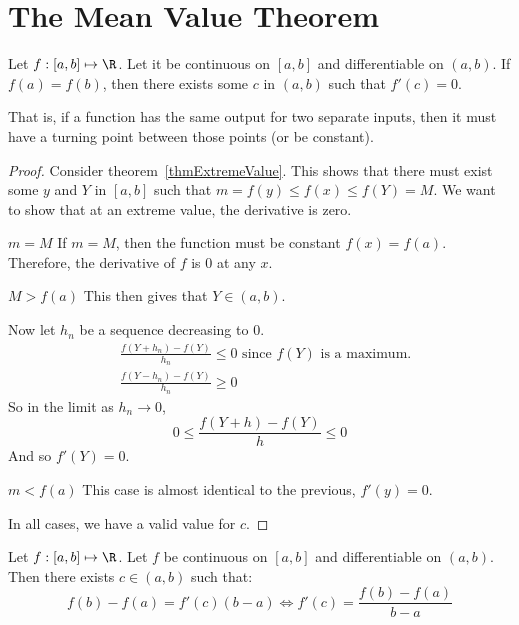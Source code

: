 \documentclass[../Main.tex]{subfiles}
\begin{document}
\section{The Mean Value Theorem}
\begin{theorem}
    Let $f : [a, b] \mapsto \R$. Let it be continuous on $[a, b]$ and differentiable on $(a, b)$. If $f(a) = f(b)$, then there exists some $c$ in $(a, b)$ such that $f'(c) = 0$.
    \label{thmRolles}
\end{theorem}
That is, if a function has the same output for two separate inputs, then it must have a turning point between those points (or be constant).
\begin{proof}
    Consider theorem~\ref{thmExtremeValue}. This shows that there must exist some $y$ and $Y$ in $[a, b]$ such that $m = f(y) \leq f(x) \leq f(Y) = M$. We want to show that at an extreme value, the derivative is zero.
    \begin{case}{$m = M$}
        If $m = M$, then the function must be constant $f(x) = f(a)$. Therefore, the derivative of $f$ is 0 at any $x$.
    \end{case}
    \begin{case}{$M > f(a)$}
        This then gives that $Y \in (a, b)$.\par
        Now let $h_n$ be a sequence decreasing to $0$.
        \begin{align*}
            &\frac{f(Y + h_n) - f(Y)}{h_n} \leq 0 \text{ since } f(Y) \text{ is a maximum.} \\
            &\frac{f(Y - h_n) - f(Y)}{h_n} \geq 0
        \end{align*}
        So in the limit as $h_n \to 0$,
        \begin{equation*}
            0 \leq \frac{f(Y + h) - f(Y)}{h} \leq 0
        \end{equation*}
        And so $f'(Y) = 0$.
    \end{case}
    \begin{case}{$m < f(a)$}
        This case is almost identical to the previous, $f'(y) = 0$.
    \end{case}
    In all cases, we have a valid value for $c$.
\end{proof}
\begin{theorem}
    Let $f : [a, b] \mapsto \R$. Let $f$ be continuous on $[a, b]$ and differentiable on $(a, b)$. Then there exists $c \in (a, b)$ such that:
    \begin{equation*}
        f(b) - f(a) = f'(c)(b - a) \Leftrightarrow f'(c) = \frac{f(b) - f(a)}{b - a}
    \end{equation*}
    \label{thmMeanValue}
\end{theorem}
\end{document}
